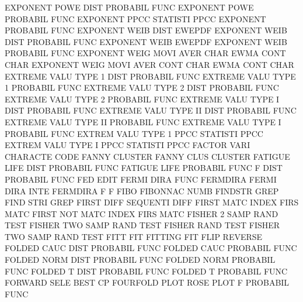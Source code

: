 EXPONENT POWE DIST                      PROBABIL FUNC
EXPONENT POWE                           PROBABIL FUNC
EXPONENT PPCC                           STATISTI PPCC
EXPONENT                                PROBABIL FUNC
EXPONENT WEIB DIST                      EWEPDF
EXPONENT WEIB DIST                      PROBABIL FUNC
EXPONENT WEIB                           EWEPDF
EXPONENT WEIB                           PROBABIL FUNC
EXPONENT WEIG MOVI AVER CHAR            EWMA     CONT CHAR
EXPONENT WEIG MOVI AVER CONT CHAR       EWMA     CONT CHAR
EXTREME  VALU TYPE 1    DIST            PROBABIL FUNC
EXTREME  VALU TYPE 1                    PROBABIL FUNC
EXTREME  VALU TYPE 2    DIST            PROBABIL FUNC
EXTREME  VALU TYPE 2                    PROBABIL FUNC
EXTREME  VALU TYPE I    DIST            PROBABIL FUNC
EXTREME  VALU TYPE II   DIST            PROBABIL FUNC
EXTREME  VALU TYPE II                   PROBABIL FUNC
EXTREME  VALU TYPE I                    PROBABIL FUNC
EXTREM   VALU TYPE 1    PPCC            STATISTI PPCC
EXTREM   VALU TYPE I    PPCC            STATISTI PPCC
FACTOR   VARI                           CHARACTE CODE
FANNY                                   CLUSTER
FANNY    CLUS                           CLUSTER
FATIGUE  LIFE DIST                      PROBABIL FUNC
FATIGUE  LIFE                           PROBABIL FUNC
F        DIST                           PROBABIL FUNC
FED                                     EDIT
FERMI    DIRA FUNC                      FERMDIRA
FERMI    DIRA INTE                      FERMDIRA
F                                       F
FIBO                                    FIBONNAC NUMB
FINDSTR                                 GREP
FIND     STRI                           GREP
FIRST    DIFF                           SEQUENTI DIFF
FIRST    MATC                           INDEX    FIRS MATC
FIRST    NOT  MATC                      INDEX    FIRS MATC
FISHER   2    SAMP RAND TEST            FISHER   TWO  SAMP RAND TEST
FISHER   RAND TEST                      FISHER   TWO  SAMP RAND TEST
FITT                                    FIT
FITTING                                 FIT
FLIP                                    REVERSE
FOLDED   CAUC DIST                      PROBABIL FUNC
FOLDED   CAUC                           PROBABIL FUNC
FOLDED   NORM DIST                      PROBABIL FUNC
FOLDED   NORM                           PROBABIL FUNC
FOLDED   T    DIST                      PROBABIL FUNC
FOLDED   T                              PROBABIL FUNC
FORWARD  SELE                           BEST     CP
FOURFOLD PLOT                           ROSE     PLOT
F                                       PROBABIL FUNC
